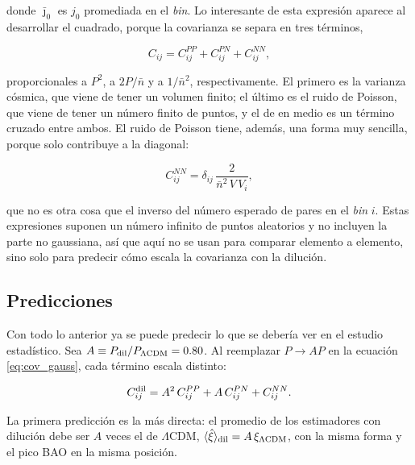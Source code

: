 \documentclass[letterpaper, 12pt]{article}
\newcommand{\LCDM}{\Lambda\mathrm{CDM}}
\begin{document}
            donde $\bar\jmath_0$ es $j_0$ promediada en el \emph{bin}. Lo interesante de esta expresión aparece al desarrollar el cuadrado, porque la covarianza se separa en tres términos,

            \begin{equation}\label{eq:cov_terminos}
                C_{ij} = C_{ij}^{PP} + C_{ij}^{PN} + C_{ij}^{NN},
            \end{equation}

            proporcionales a $P^2$, a $2P/\bar n$ y a $1/\bar n^2$, respectivamente. El primero es la varianza cósmica, que viene de tener un volumen finito; el último es el ruido de Poisson, que viene de tener un número finito de puntos, y el de en medio es un término cruzado entre ambos. El ruido de Poisson tiene, además, una forma muy sencilla, porque solo contribuye a la diagonal:

            \begin{equation}\label{eq:cov_poisson}
                C_{ij}^{NN} = \delta_{ij}\,\frac{2}{\bar n^2\, V\, V_i},
            \end{equation}

            que no es otra cosa que el inverso del número esperado de pares en el \emph{bin} $i$. Estas expresiones suponen un número infinito de puntos aleatorios y no incluyen la parte no gaussiana, así que aquí no se usan para comparar elemento a elemento, sino solo para predecir cómo escala la covarianza con la dilución.

        \subsection{Predicciones}\label{sec:predicciones}

            Con todo lo anterior ya se puede predecir lo que se debería ver en el estudio estadístico. Sea $A \equiv P_{\rm dil}/P_{\LCDM} = 0.80$. Al reemplazar $P \to AP$ en la ecuación \eqref{eq:cov_gauss}, cada término escala distinto:

            \begin{equation}\label{eq:cov_dil}
                C_{ij}^{\rm dil} = A^2\, C_{ij}^{PP} + A\, C_{ij}^{PN} + C_{ij}^{NN}.
            \end{equation}

            La primera predicción es la más directa: el promedio de los estimadores con dilución debe ser $A$ veces el de $\LCDM$, $\langle\hat\xi\rangle_{\rm dil} = A\,\xi_{\LCDM}$, con la misma forma y el pico BAO en la misma posición.
\end{document}
